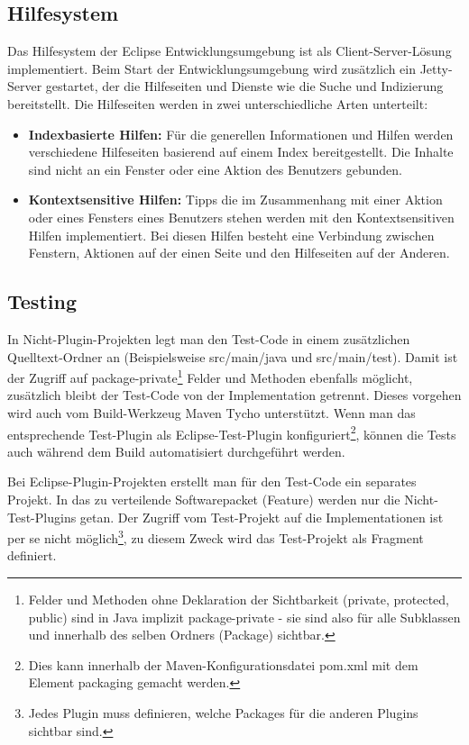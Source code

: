 \subsection{Hilfesystem}
Das Hilfesystem der Eclipse Entwicklungsumgebung ist als Client-Server-Lösung implementiert. Beim Start der Entwicklungsumgebung wird zusätzlich ein Jetty-Server gestartet, der die Hilfeseiten und Dienste wie die Suche und Indizierung bereitstellt. Die Hilfeseiten werden in zwei unterschiedliche Arten unterteilt:
\begin{itemize}
\item \textbf{Indexbasierte Hilfen:} Für die generellen Informationen und Hilfen werden verschiedene Hilfeseiten basierend auf einem Index bereitgestellt. Die Inhalte sind nicht an ein Fenster oder eine Aktion des Benutzers gebunden. 
\item \textbf{Kontextsensitive Hilfen:} Tipps die im Zusammenhang mit einer Aktion oder eines Fensters eines Benutzers stehen werden mit den Kontextsensitiven Hilfen implementiert. Bei diesen Hilfen besteht eine Verbindung zwischen Fenstern, Aktionen auf der einen Seite und den Hilfeseiten auf der Anderen.
\end{itemize}

\subsection{Testing}\label{testing}
In Nicht-Plugin-Projekten legt man den Test-Code in einem zusätzlichen Quelltext-Ordner an (Beispielsweise src/main/java und src/main/test). Damit ist der Zugriff auf package-private\footnote{Felder und Methoden ohne Deklaration der Sichtbarkeit (private, protected, public) sind in Java implizit package-private - sie sind also für alle Subklassen und innerhalb des selben Ordners (Package) sichtbar. } Felder und Methoden ebenfalls möglicht, zusätzlich bleibt der Test-Code von der Implementation getrennt. Dieses vorgehen wird auch vom Build-Werkzeug Maven Tycho unterstützt. Wenn man das entsprechende Test-Plugin als Eclipse-Test-Plugin konfiguriert\footnote{Dies kann innerhalb der Maven-Konfigurationsdatei pom.xml mit dem Element packaging gemacht werden.}, können die Tests auch während dem Build automatisiert durchgeführt werden.

Bei Eclipse-Plugin-Projekten erstellt man für den Test-Code ein separates Projekt. In das zu verteilende Softwarepacket (Feature) werden nur die Nicht-Test-Plugins getan. Der Zugriff vom Test-Projekt auf die Implementationen ist per se nicht möglich\footnote{Jedes Plugin muss definieren, welche Packages für die anderen Plugins sichtbar sind.}, zu diesem Zweck wird das Test-Projekt als Fragment definiert.
